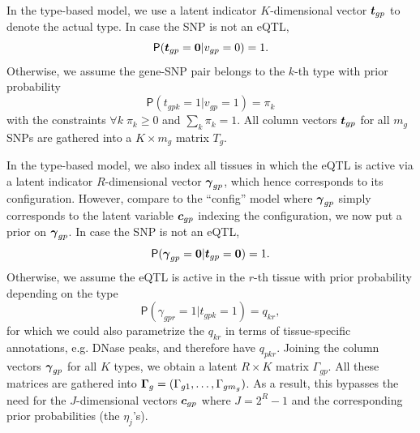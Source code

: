\documentclass[10pt]{article}
\newcommand{\Prd}{\mathsf{P}} %
\newcommand{\cv}{\mbox{\boldmath$c$}}
\newcommand{\tv}{\mbox{\boldmath$t$}}
\newcommand{\gav}{\mbox{\boldmath$\gamma$}}
\newcommand{\Gav}{\mbox{\boldmath$\Gamma$}}
\begin{document}
In the type-based model, we use a latent indicator $K$-dimensional vector $\tv_{gp}$ to denote the actual type.
In case the SNP is not an eQTL,
\begin{equation}
  \Prd(\tv_{gp} = \bm{0}  | v_{gp} = 0) = 1.
\end{equation}
Otherwise, we assume the gene-SNP pair belongs to the $k$-th type with prior probability
\begin{equation}
  \Prd(t_{gpk} = 1 | v_{gp} = 1) = \pi_k
\end{equation}
with the constraints $\forall k \; \pi_k \ge 0$ and $\sum_k \pi_k = 1$.
All column vectors $\tv_{gp}$ for all $m_g$ SNPs are gathered into a $K \times m_g$ matrix $T_g$.

In the type-based model, we also index all tissues in which the eQTL is active via a latent indicator $R$-dimensional vector $\gav_{gp}$, which hence corresponds to its configuration.
However, compare to the ``config'' model where $\gav_{gp}$ simply corresponds to the latent variable $\cv_{gp}$ indexing the configuration, we now put a prior on $\gav_{gp}$.
In case the SNP is not an eQTL,
\begin{equation}
  \Prd(\gav_{gp} = \bm{0}  | \tv_{gp} = \bm{0}) = 1.
\end{equation}
Otherwise, we assume the eQTL is active in the $r$-th tissue with prior probability depending on the type
\begin{equation}
  \Prd(\gamma_{gpr} = 1 | t_{gpk} = 1) = q_{kr},
\end{equation}
for which we could also parametrize the $q_{kr}$ in terms of tissue-specific annotations, e.g. DNase peaks, and therefore have $q_{pkr}$.
Joining the column vectors $\gav_{gp}$ for all $K$ types, we obtain a latent $R \times K$ matrix $\Gamma_{gp}$.
All these matrices are gathered into $\Gav_g = (\Gamma_{g1},\ldots,\Gamma_{gm_g})$.
As a result, this bypasses the need for the $J$-dimensional vectors $\cv_{gp}$ where $J=2^R-1$ and the corresponding prior probabilities (the $\eta_j$'s).

\end{document}
